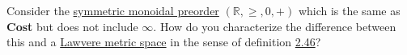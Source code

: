 Consider the \hyperref[D2.2]{symmetric monoidal preorder} $(\mathbb{R},\geq,0,+)$ which is the same as \textbf{Cost} but does not include $\infty$. How do you characterize the difference between this and a \hyperref[D2.53]{Lawvere metric space} in the sense of definition \hyperref[D2.46]{2.46}?